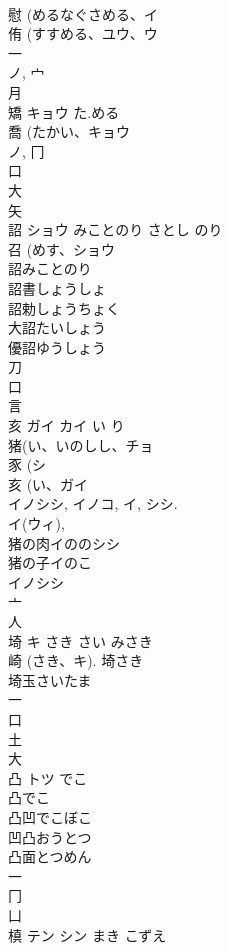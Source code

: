 \documentclass[8pt]{extreport}
\begin{document}
\begin{CJK}{UTF8}{min}
\\	慰 (めるなぐさめる、イ 
\\	侑 (すすめる、ユウ、ウ 
\\	一 
\\	ノ, 宀 
\\	月 
\\	矯	キョウ	た.める	
\\	喬 (たかい、キョウ 
\\	ノ, 冂 
\\	口 
\\	大 
\\	矢 
\\	詔	ショウ	みことのり さとし のり	
\\	召 (めす、ショウ 
\\	詔みことのり 
\\	詔書しょうしょ 
\\	詔勅しょうちょく 
\\	大詔たいしょう 
\\	優詔ゆうしょう 
\\	刀 
\\	口 
\\	言 
\\	亥	ガイ カイ	い り	
\\	猪(い、いのしし、チョ 
\\	豕 (シ 
\\	亥 (い、ガイ 
\\	イノシシ, イノコ, イ, シシ. 
\\	イ(ウィ), 
\\	猪の肉イののシシ 
\\	猪の子イのこ 
\\	イノシシ 
\\	亠 
\\	人 
\\	埼	キ	さき さい みさき	
\\	崎 (さき、キ).		埼さき
\\	埼玉さいたま
\\	一 
\\	口 
\\	土 
\\	大 
\\	凸	トツ	でこ	
\\	凸でこ
\\	凸凹でこぼこ
\\	凹凸おうとつ
\\	凸面とつめん
\\	一 
\\	冂 
\\	凵 
\\	槙	テン シン	まき こずえ	

\end{CJK}
\end{document}
